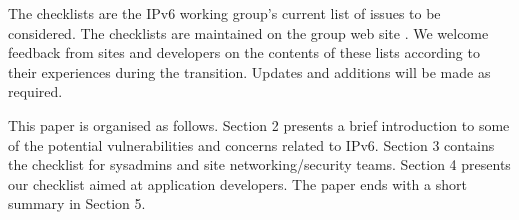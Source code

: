 The checklists are the IPv6 working group's current list of issues to be considered. The checklists are maintained on the group web site \cite {ipv6secchecklists}. We welcome feedback from sites and developers on the contents of these lists according to their experiences during the transition. Updates and additions will be made as required.

This paper is organised as follows. Section 2 presents a brief introduction to some of the potential vulnerabilities and concerns related to IPv6. Section 3 contains the checklist for sysadmins and site networking/security teams. Section 4 presents our checklist aimed at application developers. The paper ends with a short summary in Section 5.





